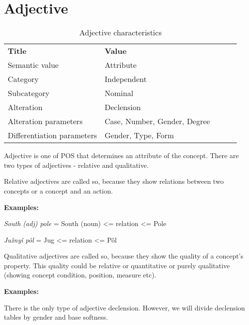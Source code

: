 \section{Adjective}

\begin{table}[h]
	\caption{Adjective characteristics}
	\begin{tabular}{lllll}
		\textbf{Title}              & \textbf{Value}               \\
		Semantic value              & Attribute                    \\
		Category                    & Independent                  \\
		Subcategory                 & Nominal                      \\
		Alteration                  & Declension                   \\
		Alteration parameters       & Case, Number, Gender, Degree \\
		Differentiation parameters  & Gender, Type, Form
	\end{tabular}
\end{table}

Adjective is one of POS that determines an attribute of the concept. There are two types of adjectives - relative and qualitative. 

Relative adjectives are called so, because they show relations between two concepts or a concept and an action.

\textbf{Examples:}

\textit{South (adj) pole} = South (noun) <= relation <= Pole

\textit{Južnyǐ pôl} = Jug <= relation <= Pôl

Qualitative adjectives are called so, because they show the quality of a concept’s property. This quality could be relative or quantitative or purely qualitative (showing concept condition, position, measure etc).

\textbf{Examples:}

There is the only type of adjective declension. However, we will divide declension tables by gender and base softness.
